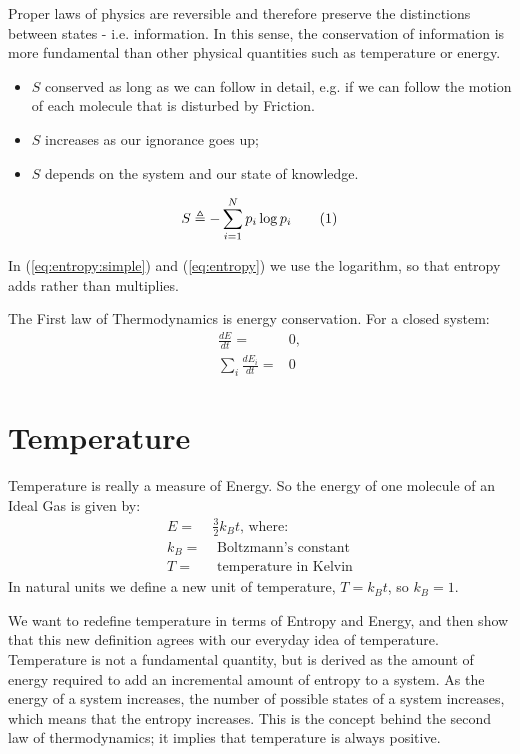\documentclass[]{article}
\newcommand\numberthis{\addtocounter{equation}{1}\tag{\theequation}}
\begin{document}
Proper laws of physics are reversible and therefore preserve the distinctions between states - i.e. information.  In this sense, the conservation of information is more fundamental than other physical quantities such as temperature or energy.  
\begin{itemize}
	\item $S$ conserved as long as we can follow in detail, e.g. if we can follow the motion of each molecule that is disturbed by Friction.
	\item $S$ increases as our ignorance goes up;
	\item $S$ depends on the system and our state of knowledge.
\end{itemize}

\begin{align*}
S \triangleq - \sum_{i=1}^{N} p_i \log{p_i} \numberthis \label{eq:entropy}
\end{align*}


In (\ref{eq:entropy:simple}) and (\ref{eq:entropy}) we use the logarithm, so that entropy adds rather than multiplies.

The First law of Thermodynamics is energy conservation. For a closed system:
\begin{align*}
\frac{dE}{dt} =& 0, \text{}\\
\sum_i \frac{dE_i}{dt} =& 0
\end{align*}


\section{Temperature}

Temperature is really a measure of Energy. So the energy of one molecule of an Ideal Gas is given by:
\begin{align*}
E =& \frac{3}{2} k_B t\text{, where:}\\
k_B =& \text{ Boltzmann's constant}\\
T =& \text{ temperature in Kelvin}
\end{align*}
 In natural units we define a new unit of temperature, $T=k_Bt$, so $k_B=1$.
 
 We want to redefine temperature in terms of Entropy and Energy, and then show that this new definition agrees with our everyday idea of temperature. Temperature is not a fundamental quantity, but is derived as the amount of energy required to add an incremental amount of entropy to a system.  As the energy of a system increases, the number of possible states of a system increases, which means that the entropy increases.  This is the concept behind the second law of thermodynamics; it implies that temperature is always positive.
 
\end{document}
